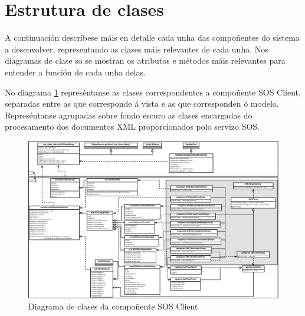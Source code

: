 \section{Estrutura de clases}
A continuación descríbese máis en detalle cada unha das compoñentes do sistema a desenvolver, representando as clases máis relevantes de cada unha. Nos diagramas de clase so se mostran os atributos e métodos máis relevantes para entender a función de cada unha delas.

No diagrama \ref{fig:diaClassSOSClient} represéntanse as clases correspondentes a compoñente SOS Client, separadas entre as que corresponde á vista e as que corresponden ó modelo. Represéntanse agrupadas sobre fondo escuro as clases encargadas do procesamento dos documentos XML proporcionados polo servizo SOS.

\begin{figure}
 \centering
 \includegraphics[width=\textwidth]{images/clases_sos_client.eps}
 \caption{Diagrama de clases da compoñente SOS Client}
 \label{fig:diaClassSOSClient}
\end{figure}

